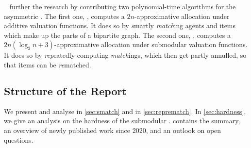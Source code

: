 ~\cite{APNSWuSVþUM} further the research by contributing two polynomial-time algorithms for the asymmetric \NSW.
The first one, \emph{\SMatch}, computes a \(2n\)-approximative allocation under additive valuation functions.
It does so by \textsl{s}martly \textsl{match}ing agents and items which make up the parts of a bipartite graph.
The second one, \emph{\RepReMatch}, computes a \(2n (\log_2 n + 3)\)-approximative allocation under submodular valuation functions.
It does so by \textsl{rep}eatedly computing \textsl{match}ings, which then get partly annulled, so that items can be \textsl{re}matched.

\subsection{Structure of the Report}
\label{subsec:intro:structure}

We present and analyse \SMatch{} in \cref{sec:smatch} and \RepReMatch{} in \cref{sec:reprematch}.
In \cref{sec:hardness}, we give an analysis on the hardness of the submodular \NSW.
 contains the summary, an overview of newly published work since 2020, and an outlook on open questions.




%

